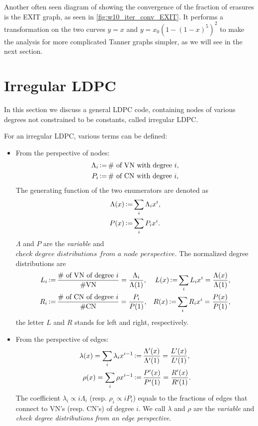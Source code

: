 Another often seen diagram of showing the convergence of the fraction of erasures is the EXIT graph, as seen in \autoref{fig:w10_iter_conv_EXIT}. It performs a transformation on the two curves $y=x$ and $y=x_0(1-(1-x)^5)^2$ to make the analysis for more complicated Tanner graphs simpler, as we will see in the next section.

\section{Irregular LDPC}
In this section we discuss a general LDPC code, containing nodes of various degrees not constrained to be constants, called irregular LDPC.

\begin{definition}
    For an irregular LDPC, various terms can be defined:
    \begin{itemize}
        \item From the perspective of nodes:
        \begin{align}
            \Lambda_i &\operatorname{\vcentcolon=} \#\text{ of VN with degree } i, \\
            P_i &\operatorname{\vcentcolon=} \#\text{ of CN with degree } i,
        \end{align}
        The generating function of the two enumerators are denoted as
        \begin{align}
            \Lambda(x) &\operatorname{\vcentcolon=} \sum_{i} \Lambda_i x^i, \\
            P(x) &\operatorname{\vcentcolon=} \sum_{i} P_i x^i.
        \end{align}
        $\Lambda$ and $P$ are the \textit{variable} and $\textit{check degree distributions from a node perspective}$. The normalized degree distributions are
        \begin{align}
            L_i &\operatorname{\vcentcolon=} \frac{\#\text{ of VN of degree } i}{\#\text{VN}} = \frac{\Lambda_i}{\Lambda(1)}, &L(x) \operatorname{\vcentcolon=} \sum_{i} L_i x^i = \frac{\Lambda(x)}{\Lambda(1)}, \\
            R_i &\operatorname{\vcentcolon=} \frac{\#\text{ of CN of degree } i}{\#\text{CN}} = \frac{P_i}{P(1)}, &R(x) \operatorname{\vcentcolon=} \sum_{i} R_i x^i = \frac{P(x)}{P(1)},
        \end{align}
        the letter $L$ and $R$ stands for left and right, respectively.
        \item From the perspective of edges:
        \begin{align}
            \lambda(x) = \sum_{i} \lambda_i x^{i-1} &\operatorname{\vcentcolon=} \frac{\Lambda'(x)}{\Lambda'(1)} = \frac{L'(x)}{L'(1)}, \\
            \rho(x) = \sum_{i} \rho x^{i-1} &\operatorname{\vcentcolon=} \frac{P'(x)}{P'(1)} = \frac{R'(x)}{R'(1)}.
        \end{align}
        The coefficient $\lambda_i\propto i\Lambda_i$ (resp. $\rho_i\propto iP_i$) equals to the fractions of edges that connect to VN's (resp. CN's) of degree $i$. We call $\lambda$ and $\rho$ are the \textit{variable} and \textit{check degree distributions from an edge perspective}.
    \end{itemize}
\end{definition}

